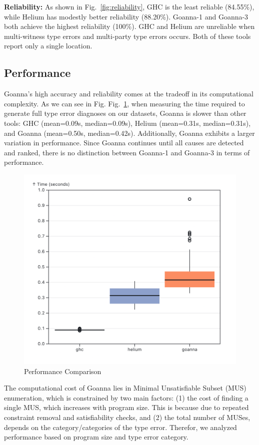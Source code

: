 \documentclass[pdflatex,sn-mathphys-num]{sn-jnl}%
\begin{document}
\textbf{Reliability:} As shown in Fig.~\ref{fig:reliability}, GHC is the least reliable (84.55\%), while Helium has modestly better reliability (88.20\%). Goanna-1 and Goanna-3 both achieve the highest reliability (100\%). GHC and Helium are unreliable when multi-witness type errors and multi-party type errors occurs. Both of these tools report only a single location. 

\subsection{Performance} \label{sub:eval-performance}
Goanna's high accuracy and reliability comes at the tradeoff in its computational complexity. As we can see in Fig. Fig.~\ref{fig:performance}, when  measuring the time required to generate full type error diagnoses on our datasets, Goanna is slower than other tools: GHC (mean=0.09s, median=0.09s), Helium (mean=0.31s, median=0.31s), and Goanna (mean=0.50s, median=0.42s). Additionally, Goanna exhibits a larger variation in performance. Since Goanna continues until all causes are detected and ranked, there is no distinction between Goanna-1 and Goanna-3 in terms of performance.

\begin{figure}[ht!]
    \centering
    \includegraphics[width=0.7\linewidth]{images/performance-overall.png}
    \caption{Performance Comparison}
    \label{fig:performance}
\end{figure}

The computational cost of Goanna lies in Minimal Unsatisfiable Subset (MUS) enumeration, which is constrained by two main factors: (1) the cost of finding a single MUS, which increases with program size. This is because  due to repeated constraint removal and satisfiability checks, and (2) the total number of MUSes, depends on the category/categories of the type error. Therefor, we analyzed performance based on program size and type error category.
\end{document}
